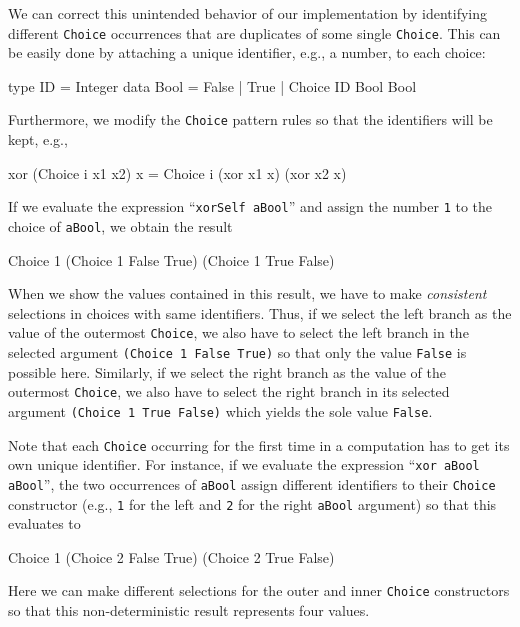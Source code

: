 \documentclass{llncs}
\newcommand{\code}[1]{\mbox{\small\texttt{#1}}}
\newcommand{\ccode}[1]{``\code{#1}''}
\begin{document}
We can correct this unintended behavior of our implementation
by identifying different \code{Choice} occurrences that are duplicates
of some single \code{Choice}. This can be easily done by attaching
a unique identifier, e.g., a number, to each choice:
\begin{haskell}
  type ID = Integer
  data Bool = False | True | Choice ID Bool Bool
\end{haskell}
Furthermore, we modify the \code{Choice} pattern rules so that
the identifiers will be kept, e.g.,
\begin{haskell}
  xor (Choice i x1 x2) x = Choice i (xor x1 x) (xor x2 x)
\end{haskell}
If we evaluate the expression \ccode{xorSelf aBool} and
assign the number \code{1}
to the choice of \code{aBool}, we obtain the result
\begin{haskell}
  Choice 1 (Choice 1 False True) (Choice 1 True False)
\end{haskell}
When we show the values contained in this result,
we have to make \emph{consistent} selections in choices with
same identifiers. Thus, if we select the left branch as the value
of the outermost \code{Choice}, we also have to select the left branch
in the selected argument \code{(Choice 1 False True)} so that only
the value \code{False} is possible here.
Similarly, if we select the right branch as the value of the outermost
\code{Choice}, we also have to select the right branch in
its selected argument \code{(Choice 1 True False)} which yields the sole
value \code{False}.

Note that each \code{Choice} occurring for the first time in a computation
has to get its own unique identifier.
For instance, if we evaluate the expression \ccode{xor aBool aBool},
the two occurrences of \code{aBool} assign different identifiers
to their \code{Choice} constructor (e.g., \code{1} for the left
and \code{2} for the right \code{aBool} argument) so that this evaluates to
\begin{haskell}
  Choice 1 (Choice 2 False True) (Choice 2 True False)
\end{haskell}
Here we can make different selections for the outer and inner
\code{Choice} constructors so that this non-deterministic result represents
four values.
\end{document}
